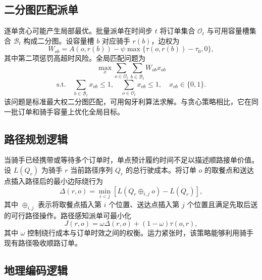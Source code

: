 \documentclass[12pt,a4paper]{article}
\begin{document}
    \subsection{二分图匹配派单}

    逐单贪心可能产生局部最优。批量派单在时间步 $t$ 将订单集合 $\mathcal{O}_t$ 与可用容量槽集合 $\mathcal{B}_t$ 构成二分图。设容量槽 $b$ 对应骑手 $r(b)$，边权为
    \begin{equation}
        W_{ob}=A(o,r(b))-\psi\max\{\tau(o,r(b))-\tau_0,0\},
    \end{equation}
    其中第二项惩罚高超时风险。全局匹配问题为
    \begin{equation}
        \max_{x}\sum_{o\in\mathcal{O}_t}\sum_{b\in\mathcal{B}_t}W_{ob}x_{ob}
    \end{equation}
    \begin{equation}
        \text{s.t.}\quad \sum_{b\in\mathcal{B}_t}x_{ob}\le 1,\quad \sum_{o\in\mathcal{O}_t}x_{ob}\le 1,\quad x_{ob}\in\{0,1\}.
    \end{equation}
    该问题是标准最大权二分图匹配，可用匈牙利算法求解\cite{kuhn1955hungarian}。与贪心策略相比，它在同一批订单和骑手容量上优化全局目标。

    \subsection{路径规划逻辑}

    当骑手已经携带或等待多个订单时，单点预计履约时间不足以描述顺路接单价值。设 $L(Q_r)$ 为骑手 $r$ 当前路径序列 $Q_r$ 的总行驶成本。将订单 $o$ 的取餐点和送达点插入路径后的最小边际绕行为
    \begin{equation}
        \Delta(r,o)=\min_{i<j}\left[L\left(Q_r\oplus_{i,j}o\right)-L(Q_r)\right],
    \end{equation}
    其中 $\oplus_{i,j}$ 表示将取餐点插入第 $i$ 个位置、送达点插入第 $j$ 个位置且满足先取后送的可行路径操作。路径感知派单可最小化
    \begin{equation}
        J(r,o)=\omega\Delta(r,o)+(1-\omega)\tau(o,r),
    \end{equation}
    其中 $\omega$ 控制绕行成本与订单时效之间的权衡。运力紧张时，该策略能够利用骑手现有路径吸收顺路订单。

    \subsection{地理编码逻辑}
\end{document}
